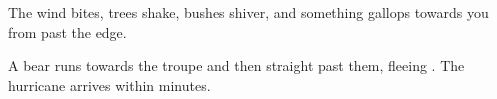 \begin{boxtext}
  The wind bites, trees shake, bushes shiver, and something gallops towards you from past the \gls{edge}.
\end{boxtext}

A bear runs towards the troupe and then straight past them, fleeing .
The \gls{hurricane} arrives within minutes.

\bear

